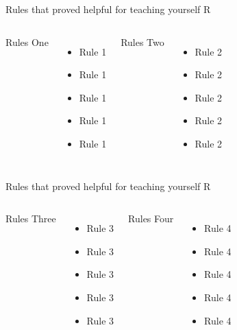 \documentclass{beamer}
\begin{document}
\begin{frame}[t]{Rules that proved helpful for teaching yourself R}
	\scriptsize
	
	\begin{columns}[t] 
		 {Rules One}
		\begin{itemize}
			\item Rule 1
			\item   Rule 1
			\item   Rule 1
			\item  Rule 1
			\item  Rule 1
		\end{itemize}
		
		 {Rules Two}
		\begin{itemize}
			\item Rule 2
			\item   Rule 2
			\item   Rule 2
			\item  Rule 2
			\item  Rule 2
		\end{itemize}	
		
	\end{columns}		

\end{frame}

\begin{frame}[t]{Rules that proved helpful for teaching yourself R}
	\scriptsize
	
	\begin{columns}[t] 
		 {Rules Three}
		\begin{itemize}
			\item Rule 3
			\item   Rule 3
			\item   Rule 3
			\item  Rule 3
			\item  Rule 3
		\end{itemize}
		
		 {Rules Four}
		\begin{itemize}
			\item Rule 4
			\item   Rule 4
			\item   Rule 4
			\item  Rule 4
			\item  Rule 4
		\end{itemize}	
		
	\end{columns}		
	
\end{frame}
\end{document}
